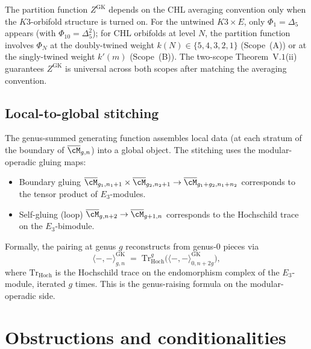 \begin{remark}
\label{rem:gk-partition-two-scopes}
The partition function $Z^{\mathrm{GK}}$ depends on the CHL averaging
convention only when the $K3$-orbifold structure is turned on. For the
untwined $K3 \times E$, only $\Phi_1 = \Delta_5$ appears (with
$\Phi_{10} = \Delta_5^2$); for CHL orbifolds at level $N$, the
partition function involves $\Phi_N$ at the doubly-twined weight
$k(N) \in \{5, 4, 3, 2, 1\}$ (Scope~(A)) or at the singly-twined weight
$k'(m)$ (Scope~(B)). The two-scope Theorem~V.$1$(ii) guarantees
$Z^{\mathrm{GK}}$ is universal across both scopes after matching the
averaging convention.
\end{remark}

\subsection*{Local-to-global stitching}

The genus-summed generating function assembles local data (at each
stratum of the boundary of $\overline{\cM}_{g, n}$) into a global
object. The stitching uses the modular-operadic gluing maps:
\begin{itemize}
\item Boundary gluing $\overline{\cM}_{g_1, n_1 + 1} \times
\overline{\cM}_{g_2, n_2 + 1} \to \overline{\cM}_{g_1 + g_2, n_1 + n_2}$
corresponds to the tensor product of $E_3$-modules.
\item Self-gluing (loop) $\overline{\cM}_{g, n + 2} \to
\overline{\cM}_{g + 1, n}$ corresponds to the Hochschild trace on the
$E_3$-bimodule.
\end{itemize}

Formally, the pairing at genus $g$ reconstructs from genus-$0$ pieces via
\[
 \langle -, - \rangle^{\mathrm{GK}}_{g, n} \;=\;
 \mathrm{Tr}_{\mathrm{Hoch}}^g\bigl(\langle -, - \rangle^{\mathrm{GK}}_{0, n + 2g}\bigr),
\]
where $\mathrm{Tr}_{\mathrm{Hoch}}$ is the Hochschild trace on the
endomorphism complex of the $E_3$-module, iterated $g$ times. This is
the genus-raising formula on the modular-operadic side.


\section{Obstructions and conditionalities}
\label{sec:obstructions-conditionalities}

